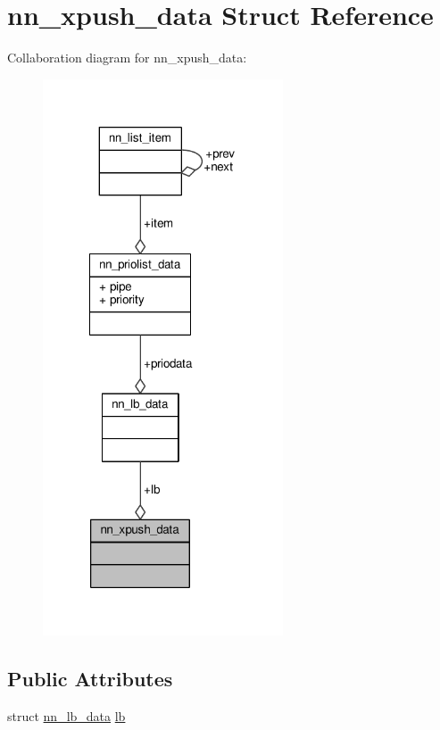 \hypertarget{structnn__xpush__data}{}\section{nn\+\_\+xpush\+\_\+data Struct Reference}
\label{structnn__xpush__data}


Collaboration diagram for nn\+\_\+xpush\+\_\+data\+:\nopagebreak
\begin{figure}[H]
\begin{center}
\leavevmode
\includegraphics[width=202pt]{structnn__xpush__data__coll__graph}
\end{center}
\end{figure}
\subsection*{Public Attributes}
\begin{DoxyCompactItemize}
\item 
struct \hyperlink{structnn__lb__data}{nn\+\_\+lb\+\_\+data} \hyperlink{structnn__xpush__data_ac8eb3f7d4f57f2d9e6af5ce2f9f3f5b8}{lb}
\end{DoxyCompactItemize}


